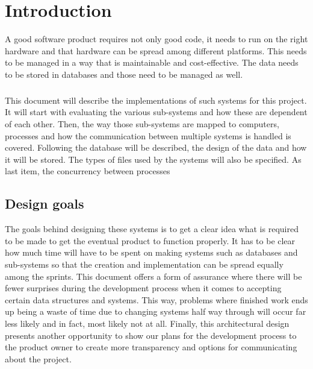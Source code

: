 \chapter{Introduction}
A good software product requires not only good code, it needs to run on the right hardware and that hardware can be spread among different platforms. This needs to be managed in a way that is maintainable and cost-effective. The data needs to be stored in databases and those need to be managed as well.
\paragraph{}
This document will describe the implementations of such systems for this project. It will start with evaluating the various sub-systems and how these are dependent of each other. Then, the way those sub-systems are mapped to computers, processes and how the communication between multiple systems is handled is covered. 
Following the database will be described, the design of the data and how it will be stored. The types of files used by the systems will also be specified. 
As last item, the concurrency between processes 

\section{Design goals}
The goals behind designing these systems is to get a clear idea what is required to be made to get the eventual product to function properly. It has to be clear how much time will have to be spent on making systems such as databases and sub-systems so that the creation and implementation can be spread equally among the sprints. This document offers a form of assurance where there will be fewer surprises during the development process when it comes to accepting certain data structures and systems. This way, problems where finished work ends up being a waste of time due to changing systems half way through will occur far less likely and in fact, most likely not at all.
Finally, this architectural design presents another opportunity to show our plans for the development process to the product owner to create more transparency and options for communicating about the project.

